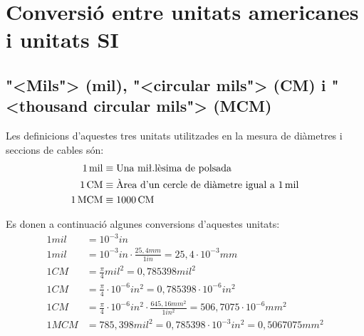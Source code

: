 \section{Conversi\'{o} entre unitats americanes i unitats SI}

\subsection{{"<}Mils{">} (mil), {"<}circular mils{">} (CM) i {"<}thousand circular mils{">} (MCM)}
  

  Les definicions d'aquestes tres unitats utilitzades en la mesura de di\`{a}metres i seccions de cables s\'{o}n:
\begin{align}
  1\unit{mil} &\equiv \text{Una mi{\l.l}\`{e}sima de polsada} \\
  1\unit{CM} &\equiv  \text{\`{A}rea d'un cercle de di\`{a}metre igual a 1\unit{mil}} \\
  1\unit{MCM} &\equiv 1000\unit{CM}
\end{align}

  Es donen a continuaci\'{o} algunes conversions d'aquestes unitats:
\begin{align}
   1\unit{mil} &= 10^{-3}\unit{in}  \\
  1\unit{mil} &= 10^{-3}\unit{in} \cdot \frac{25{,}4\unit{mm}}{1\unit{in}} = 25{,}4 \cdot 10^{-3}\unit{mm}  \\
  1\unit{CM} &= \frac{\pi}{4}\unit{mil^2} = 0{,}785398\unit{mil^2}   \\
   1\unit{CM} &= \frac{\pi}{4}\cdot 10^{-6}\unit{in^2} = 0{,}785398\cdot 10^{-6}\unit{in^2} \\
   1\unit{CM} &= \frac{\pi}{4} \cdot 10^{-6}\unit{in^2} \cdot \frac{645{,}16\unit{mm^2}}{1\unit{in^2}} = 506{,}7075\cdot 10^{-6}\unit{mm^2}
   \\[1ex]
   1\unit{MCM} &= 785{,}398\unit{mil^2}  = 0{,}785398\cdot 10^{-3}\unit{in^2} = 0{,}5067075\unit{mm^2}
\end{align}

